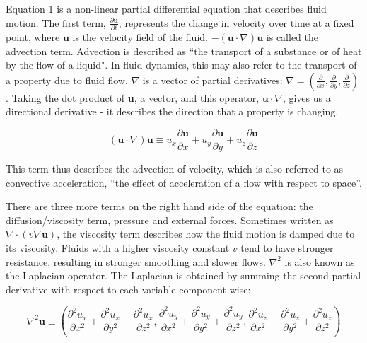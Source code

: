 \documentclass[a4paper, 12pt]{article}
\begin{document}
    Equation 1 is a non-linear partial differential equation that describes fluid motion\cite{slides}. The first term, $\frac{\partial{\textbf{u}}}{\partial{t}}$, represents the change in velocity over time at a fixed point, where $\textbf{u}$ is the velocity field of the fluid. $-(\textbf{u}\cdot\nabla)\textbf{u}$ is called the advection term. Advection is described as ``the transport of a substance or of heat by the flow of a liquid"\cite{cambridge}. In fluid dynamics, this may also refer to the transport of a property due to fluid flow. $\nabla$ is a vector of partial derivatives: $\nabla = (\frac{\partial}{\partial x}, \frac{\partial}{\partial y}, \frac{\partial}{\partial z})$. Taking the dot product of \textbf{u}, a vector, and this operator, $\textbf{u}\cdot\nabla$, gives us a directional derivative - it describes the direction that a property is changing.

    \begin{equation*}
        (\textbf{u}\cdot\nabla)\textbf{u} \equiv u_x \frac{\partial \textbf{u}}{\partial x} + u_y \frac{\partial \textbf{u}}{\partial y} + u_z \frac{\partial \textbf{u}}{\partial z}
    \end{equation*}

    This term thus describes the advection of velocity, which is also referred to as convective acceleration, ``the effect of acceleration of a flow with respect to space''\cite{nswikipedia}.

    There are three more terms on the right hand side of the equation: the diffusion/viscosity term, pressure and external forces. Sometimes written as $\nabla \cdot (v\nabla\textbf{u})$, the viscosity term describes how the fluid motion is damped due to its viscosity. Fluids with a higher viscosity constant $v$ tend to have stronger resistance, resulting in stronger smoothing and slower flows. $\nabla^2$ is also known as the Laplacian operator. The Laplacian is obtained by summing the second partial derivative with respect to each variable component-wise:

    \begin{equation*}
        \nabla^2\textbf{u} \equiv (\frac{\partial^2{u_x}}{\partial{x^2}} + \frac{\partial^2{u_x}}{\partial{y^2}} + \frac{\partial^2{u_x}}{\partial{z^2}}, \frac{\partial^2{u_y}}{\partial{x^2}} + \frac{\partial^2{u_y}}{\partial{y^2}} + \frac{\partial^2{u_y}}{\partial{z^2}}, \frac{\partial^2{u_z}}{\partial{x^2}} + \frac{\partial^2{u_z}}{\partial{y^2}} + \frac{\partial^2{u_z}}{\partial{z^2}})
    \end{equation*}
\end{document}
